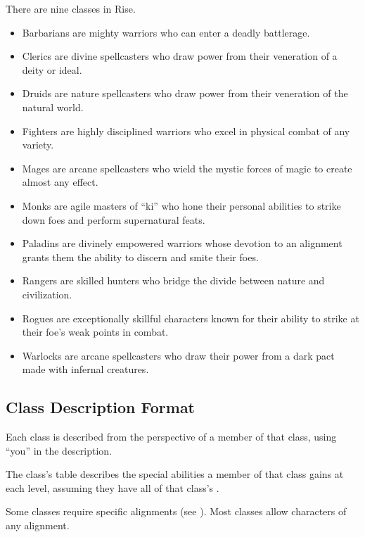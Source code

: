     There are nine classes in Rise.
    \begin{itemize}
        \item Barbarians are mighty warriors who can enter a deadly battlerage.
        \item Clerics are divine spellcasters who draw power from their veneration of a deity or ideal.
        \item Druids are nature spellcasters who draw power from their veneration of the natural world.
        \item Fighters are highly disciplined warriors who excel in physical combat of any variety.
        \item Mages are arcane spellcasters who wield the mystic forces of magic to create almost any effect.
        \item Monks are agile masters of ``ki'' who hone their personal abilities to strike down foes and perform supernatural feats.
        \item Paladins are divinely empowered warriors whose devotion to an alignment grants them the ability to discern and smite their foes.
        \item Rangers are skilled hunters who bridge the divide between nature and civilization.
        \item Rogues are exceptionally skillful characters known for their ability to strike at their foe's weak points in combat.
        \item Warlocks are arcane spellcasters who draw their power from a dark pact made with infernal creatures.
    \end{itemize}

    \subsection{Class Description Format}
        Each class is described from the perspective of a member of that class, using ``you'' in the description.

        The class's table describes the special abilities a member of that class gains at each level, assuming they have all of that class's .

        Some classes require specific alignments (see ).
        Most classes allow characters of any alignment.

